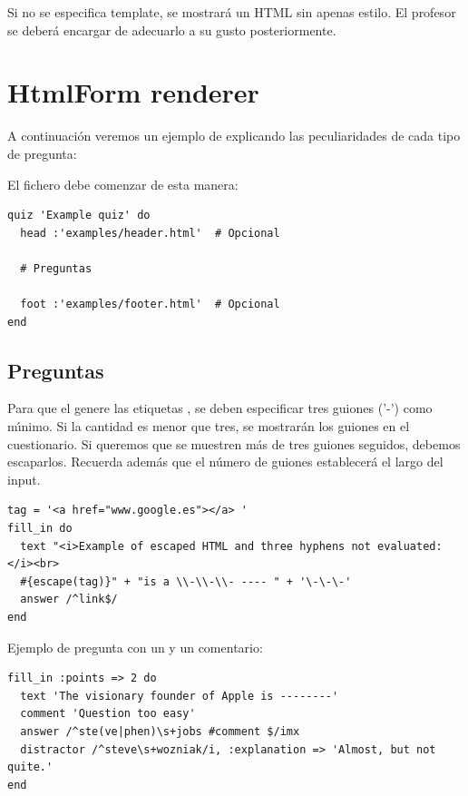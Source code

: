 

Si no se especifica template, se mostrar\'a un HTML sin apenas estilo. El profesor se deber\'a encargar de adecuarlo a su gusto posteriormente. 

\section{HtmlForm renderer}
\label{Apendice2:htmlform}

A continuaci\'on veremos un ejemplo de  explicando las peculiaridades de cada tipo de pregunta:

El fichero  debe comenzar de esta manera:
\begin{lstlisting}
quiz 'Example quiz' do
  head :'examples/header.html'  # Opcional
  
  # Preguntas
  
  foot :'examples/footer.html'  # Opcional
end
\end{lstlisting}
\bigskip

\subsection{Preguntas }
\label{subsec:Apendice2.1}

Para que el  genere las etiquetas , se deben especificar tres guiones ('-') como m\'{\i}nimo. Si la cantidad es menor que tres, se mostrar\'an los guiones
en el cuestionario. Si queremos que se muestren m\'as de tres guiones seguidos, debemos escaparlos. Recuerda adem\'as que el n\'umero de guiones establecer\'a el largo del input.
\begin{lstlisting}
tag = '<a href="www.google.es"></a> '
fill_in do
  text "<i>Example of escaped HTML and three hyphens not evaluated:</i><br> 
  #{escape(tag)}" + "is a \\-\\-\\- ---- " + '\-\-\-'
  answer /^link$/
end
\end{lstlisting}
\bigskip

Ejemplo de pregunta con un  y un comentario:
\begin{lstlisting}
fill_in :points => 2 do
  text 'The visionary founder of Apple is --------'
  comment 'Question too easy'
  answer /^ste(ve|phen)\s+jobs #comment $/imx
  distractor /^steve\s+wozniak/i, :explanation => 'Almost, but not quite.'
end
\end{lstlisting}
\bigskip

